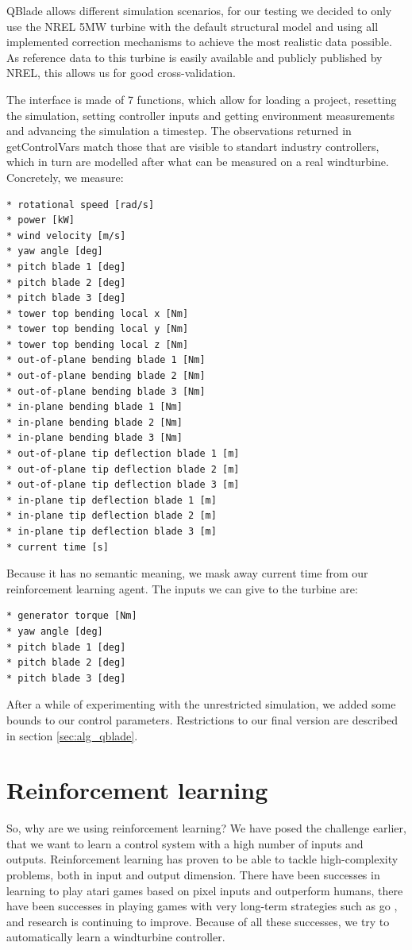 \documentclass[hyperref,german,beleg]{cgvpub}
\begin{document}
QBlade allows different simulation scenarios, for our testing we decided to only use the NREL 5MW \cite{jonkmanDefinition5MWReference2009} turbine with the default structural model and using all implemented correction mechanisms to achieve the most realistic data possible. As reference data to this turbine is easily available and publicly published by NREL, this allows us for good cross-validation.

The interface is made of 7 functions, which allow for loading a project, resetting the simulation, setting controller inputs and getting environment measurements and advancing the simulation a timestep. The observations returned in getControlVars match those that are visible to standart industry controllers, which in turn are modelled after what can be measured on a real windturbine. Concretely, we measure:
\begin{verbatim}
* rotational speed [rad/s]
* power [kW]
* wind velocity [m/s]
* yaw angle [deg]
* pitch blade 1 [deg]
* pitch blade 2 [deg]
* pitch blade 3 [deg]
* tower top bending local x [Nm]
* tower top bending local y [Nm]
* tower top bending local z [Nm]
* out-of-plane bending blade 1 [Nm]
* out-of-plane bending blade 2 [Nm]
* out-of-plane bending blade 3 [Nm]
* in-plane bending blade 1 [Nm]
* in-plane bending blade 2 [Nm]
* in-plane bending blade 3 [Nm]
* out-of-plane tip deflection blade 1 [m]
* out-of-plane tip deflection blade 2 [m]
* out-of-plane tip deflection blade 3 [m]
* in-plane tip deflection blade 1 [m]
* in-plane tip deflection blade 2 [m]
* in-plane tip deflection blade 3 [m]
* current time [s]
\end{verbatim}

Because it has no semantic meaning, we mask away current time from our reinforcement learning agent. The inputs we can give to the turbine are:
\begin{verbatim}
* generator torque [Nm]
* yaw angle [deg]
* pitch blade 1 [deg]
* pitch blade 2 [deg]
* pitch blade 3 [deg]
\end{verbatim}

After a while of experimenting with the unrestricted simulation, we added some bounds to our control parameters. Restrictions to our final version are described in section \ref{sec:alg_qblade}.

\section{Reinforcement learning}

So, why are we using reinforcement learning? We have posed the challenge earlier, that we want to learn a control system with a high number of inputs and outputs. Reinforcement learning has proven to be able to tackle high-complexity problems, both in input and output dimension. There have been successes in learning to play atari games based on pixel inputs \cite{mnihPlayingAtariDeep2013} and outperform humans, there have been successes in playing games with very long-term strategies such as go \cite{silverMasteringGameGo2016}, and research is continuing to improve. Because of all these successes, we try to automatically learn a windturbine controller.
\end{document}
